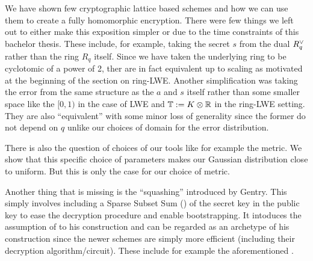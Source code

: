 We have shown few cryptographic lattice based schemes and how we can use them to create a fully homomorphic encryption. There were few things we left out to either make this exposition simpler or due to the time constraints of this bachelor thesis. These include, for example, taking the secret $s$ from the dual $R^{\vee}_q$ rather than the ring $R_q$ itself. Since we have taken the underlying ring to be cyclotomic of a power of 2, ther are in fact equivalent up to scaling as motivated at the beginning of the section on ring-LWE. Another simplification was taking the error from the same structure as the $a$ and $s$ itself rather than some smaller space like the $[0,1)$ in the case of LWE and $\mathbb{T} := K \otimes \mathbb{R}$ in the ring-LWE setting. They are also ``equivalent'' with some minor loss of generality since the former do not depend on $q$ unlike our choices of domain for the error distribution.

There is also the question of choices of our tools like for example the metric. We show that this specific choice of parameters makes our Gaussian distribution close to uniform. But this is only the case for our choice of metric.

Another thing that is missing is the ``squashing'' introduced by Gentry. This simply involves including a Sparse Subset Sum () of the secret key in the public key to ease the decryption procedure and enable bootstrapping. It intoduces the assumption of  to his construction and can be regarded as an archetype of his construction since the newer schemes are simply more efficient (including their decryption algorithm/circuit). These include for example the aforementioned \cite{fhe_rlwe}.


